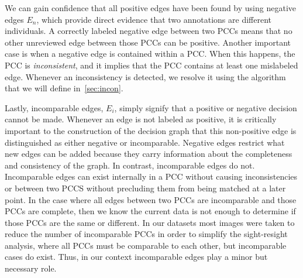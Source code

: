 We can gain confidence that all positive edges have been found by using negative edges $E_n$, which provide
  direct evidence that two annotations are different individuals.
A correctly labeled negative edge between two PCCs means that no other unreviewed edge between those PCCs can be
  positive.
Another important case is when a negative edge is contained within a PCC.
When this happens, the PCC is \emph{inconsistent}, and it implies that the PCC contains at least one mislabeled
  edge.
Whenever an inconsistency is detected, we resolve it using the algorithm that we will define in~\cref{sec:incon}.

Lastly, incomparable edges, $E_i$, simply signify that a positive or negative decision cannot be made.
Whenever an edge is not labeled as positive, it is critically important to the construction of the decision graph
  that this non-positive edge is distinguished as either negative or incomparable.
Negative edges restrict what new edges can be added because they carry information about the completeness and
  consistency of the graph.
In contrast, incomparable edges do not.
Incomparable edges can exist internally in a PCC without causing inconsistencies or between two PCCS without
  precluding them from being matched at a later point.
In the case where all edges between two PCCs are incomparable and those PCCs are complete, then we know the
  current data is not enough to determine if those PCCs are the same or different.
In our datasets most images were taken to reduce the number of incomparable PCCs in order to simplify the
  sight-resight analysis, where all PCCs must be comparable to each other, but incomparable cases do exist.
Thus, in our context incomparable edges play a minor but necessary role.




